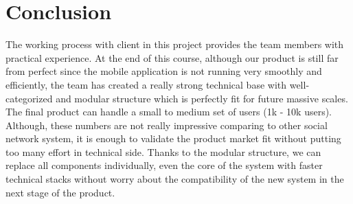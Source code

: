 \chapter{Conclusion}
The working process with client in this project provides the team members with practical experience. At the end of this course, although our product is still far from perfect since the mobile application is not running very smoothly and efficiently, the team has created a really strong technical base with well-categorized and modular structure which is perfectly fit for future massive scales. The final product can handle a small to medium set of users (1k - 10k users). Although, these numbers are not really impressive comparing to other social network system, it is enough to validate the product market fit without putting too many effort in technical side. Thanks to the modular structure, we can replace all components individually, even the core of the system with faster technical stacks without worry about the compatibility of the new system in the next stage of the product.

